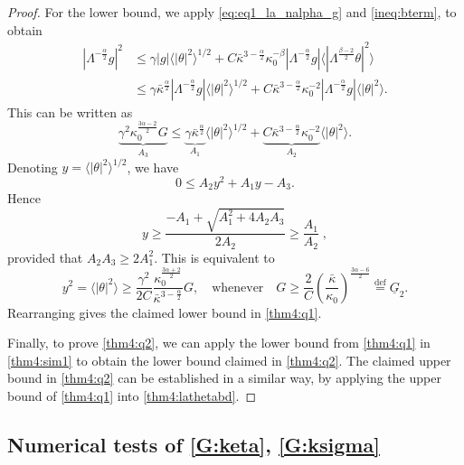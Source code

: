 \documentclass[twoside, reqno]{amsart}
\numberwithin{lemma}{section}
\numberwithin{theorem}{section}
\numberwithin{proposition}{section}
\numberwithin{equation}{section} %
\newcommand{\te}{\theta}
\newcommand{\ga}{\gamma}
\newcommand{\la}{\Lambda}
\newcommand{\ka}{\kappa}
\newcommand{\bkap}{\bar{\kap}}
\newcommand{\Gb}{\underline{G}}
\newcommand{\al}{\alpha}
\newcommand{\kap}{\kappa}
\begin{document}
\begin{proof}
{For the lower bound, we apply} \eqref{eq:eq1_la_nalpha_g} and \eqref{ineq:bterm}, {to obtain}
\begin{align*}
    |\la^{-\frac{\al}{2}}g|^2 &\le \ga |g| \langle |\te|^2 \rangle ^ {1/2} + C \bar{\ka}^{3-\frac{\alpha}{2}}\ka_0^{-\beta} |\la^{-\frac{\alpha}{2}}g| \langle |\la^{\frac{\beta-2}{2}}\te|^2 \rangle \\&\le \ga \bar{\ka}^{\frac{\al}{2}} |\la^{-\frac{\alpha}{2}}g| \langle |\te|^2 \rangle ^ {1/2} + C \bar{\ka}^{3-\frac{\alpha}{2}}\ka_0^{-2} |\la^{-\frac{\alpha}{2}}g| \langle |\te|^2 \rangle.
\end{align*}
{This} can be written as 
\begin{equation*}
    \underbrace{\ga^2 \ka_0^{\frac{3\al-2}{2}} G}_{A_3} \le \underbrace{\ga \bar{\ka}^{\frac{\al}{2}}}_{A_1} \langle |\te|^2 \rangle ^ {1/2} + \underbrace{C \bar{\ka}^{3-\frac{\alpha}{2}}\ka_0^{-2}}_{A_2} \langle |\te|^2 \rangle .
\end{equation*}
Denoting $y = \langle |\te|^2 \rangle ^ {1/2}$, we have
\begin{equation*}
    0 \le A_2 y^2 + A_1 y - A_3.
\end{equation*}
{Hence}
\begin{equation*}
y \ge \frac{-A_1 + \sqrt{A_1^2 + 4A_2A_3}}{2A_2} 
\ge \frac{A_1}{A_2} \;,
\end{equation*}
provided {that} $A_2A_3 \ge 2A_1^2$.
This is equivalent to
\begin{equation*} 
    y^2 = \langle |\te|^2 \rangle \ge \frac{\ga^2}{2C} \frac{\ka_0^{\frac{3\al+2}{2}}}{\bar{\ka}^{3-\frac{\al}{2}}} G, \quad \text{whenever}\quad G \ge
        \frac{2}{C}\left(\frac{\bkap}{\kap_0}\right)^{\frac{3\al-6}2}\overset{\text{def}}{=}\Gb_2.
\end{equation*}
Rearranging gives the {claimed}  lower bound in \eqref{thm4:q1}. 

Finally, {to prove \eqref{thm4:q2}}, we can apply the lower bound from \eqref{thm4:q1} in \eqref{thm4:sim1} to obtain the lower bound {claimed in} \eqref{thm4:q2}. {The claimed upper bound in \eqref{thm4:q2} can be established in a similar way}, by applying the upper bound of \eqref{thm4:q1} into \eqref{thm4:lathetabd}.
\end{proof}


\subsection{Numerical tests of \eqref{G:keta}, \eqref{G:ksigma}}
\end{document}
